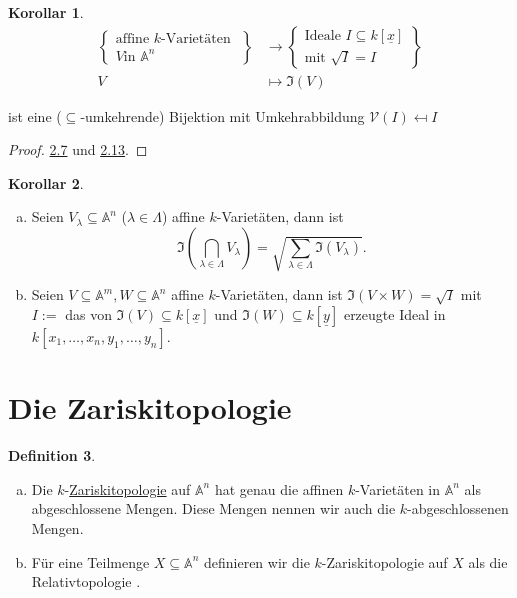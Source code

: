 \documentclass[
twoside=semi,
fontsize=12,
DIV=12, 
cleardoublepage=current,
leqno,
headings=optiontoheadandtoc, 
toc=idx
]{scrbook}
\newcommand{\A}{\mathbb{A}}
\newcommand{\V}{\mathcal{V}}
\newcommand{\x}{\underline{x}}
\newcommand{\I}{\mathfrak{I}}
\newcommand{\brac}[1]{\left( #1 \right)}
\newcommand{\emphasize}[1]{\underline{#1}}
\theoremstyle{definition}
\newtheorem{definition}{Definition}[section]
\newtheorem{korollar}[definition]{Korollar}
\begin{document}
	\begin{korollar}\label{1.2.16}\hfill\newline
		\begin{align*}
			\begin{Bmatrix}
				\textrm{affine } k\textrm{-Variet\"aten }\\V \textrm{in } \A^n
			\end{Bmatrix}
			&\to \begin{Bmatrix}
				\textrm{Ideale } I \subseteq k[\x]\\
				\textrm{mit } \sqrt{I} = I
			\end{Bmatrix}\\
			V &\mapsto \I(V)
		\end{align*}
	
		ist eine ($\subseteq$-umkehrende) Bijektion mit Umkehrabbildung $\V(I) \mapsfrom I$
	\end{korollar}

	\begin{proof}
		\hyperref[1.2.7]{2.7} und \hyperref[1.2.13]{2.13}.
	\end{proof}

	\begin{korollar}\label{1.2.17}\hfill
		\begin{enumerate}[(a)]
			\item Seien $V_\lambda \subseteq \A^n$ ($\lambda \in \Lambda$) affine $k$-Variet\"aten, dann ist 
				\[\I\brac{\bigcap_{\lambda \in \Lambda} V_{\lambda}} = \sqrt{\sum_{\lambda \in \Lambda} \I(V_\lambda)}.\]
			
			\item Seien $V \subseteq \A^m, W \subseteq \A^n$ affine $k$-Variet\"aten, dann ist $\I(V \times W) = \sqrt{I}$ mit $I:= $ das von $\I(V) \subseteq k[\x]$ und $\I(W) \subseteq k[\underline{y}]$ erzeugte Ideal in $k[x_1, \dots, x_n, y_1, \dots, y_n]$.
		\end{enumerate}
	\end{korollar}

	\newpage
	\section{Die Zariskitopologie}\thispagestyle{sectionstart}
	\begin{definition}\label{1.3.1}\hfill
		\begin{enumerate}[(a)]
			\item Die $k$-\emphasize{Zariskitopologie} auf $\A^n$ hat genau die affinen $k$-Variet\"aten in $\A^n$ als abgeschlossene Mengen. Diese Mengen nennen wir auch die $k$-abgeschlossenen Mengen.
			
			\item F\"ur eine Teilmenge $X \subseteq \A^n$ definieren wir die $k$-Zariskitopologie auf $X$ als die Relativtopologie .
		\end{enumerate}
	\end{definition}
\end{document}
